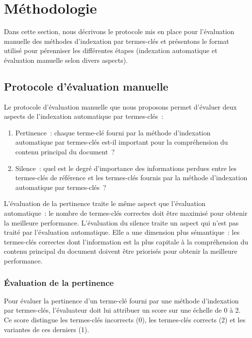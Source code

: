 
  \section{Méthodologie}
  \label{section:main-automatic_evaluation_of_keyphrase_annotation-methodology}
    Dans cette section, nous décrivons le protocole mis en place pour
    l'évaluation manuelle des méthodes d'indexation par termes-clés et
    présentons le format utilisé pour pérenniser les différentes étapes
    (indexation automatique et évaluation manuelle selon divers aspects).

    \subsection{Protocole d'évaluation manuelle}
    \label{subsec:main-automatic_evaluation_of_keyphrase_annotation-methodology-evaluation_protocol}
      Le protocole d'évaluation manuelle que nous proposons permet d'évaluer
      deux aspects de l'indexation automatique par termes-clés~:
      \begin{enumerate}
        \item{Pertinence~: chaque terme-clé fourni par la méthode d'indexation
              automatique par termes-clés est-il important pour la compréhension
              du contenu principal du document~?}
        \item{Silence~: quel est le degré d'importance des informations perdues
              entre les termes-clés de référence et les termes-clés fournis par
              la méthode d'indexation automatique par termes-clés~?}
      \end{enumerate}
      L'évaluation de la pertinence traite le même aspect que l'évaluation
      automatique~: le nombre de termes-clés correctes doit être maximisé pour
      obtenir la meilleure performance. L'évaluation du silence traite un aspect
      qui n'est pas traité par l'évaluation automatique. Elle a une dimension
      plus sémantique~: les termes-clés correctes dont l'information est la plus
      capitale à la compréhension du contenu principal du document doivent être
      priorisés pour obtenir la meilleure performance.

      \subsubsection{Évaluation de la pertinence}
      \label{subsubsec:main-automatic_evaluation_of_keyphrase_annotation-methodology-evaluation_protocol-relevancy}
        Pour évaluer la pertinence d'un terme-clé fourni par une méthode
        d'indexation par termes-clés, l'évaluateur doit lui attribuer un score
        sur une échelle de 0 à 2. Ce score distingue les termes-clés incorrects
        (0), les termes-clés corrects (2) et les variantes de ces derniers (1).

